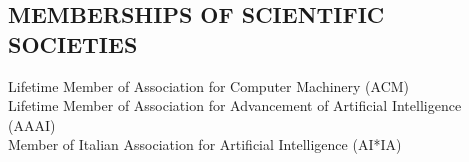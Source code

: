 \vspace{-2ex}
\subsection*{MEMBERSHIPS OF SCIENTIFIC SOCIETIES}
\vspace{-2ex}

Lifetime Member of  Association for Computer Machinery (ACM)\\ Lifetime Member of Association for Advancement of Artificial Intelligence (AAAI)\\ Member of  Italian Association for Artificial Intelligence (AI*IA)

